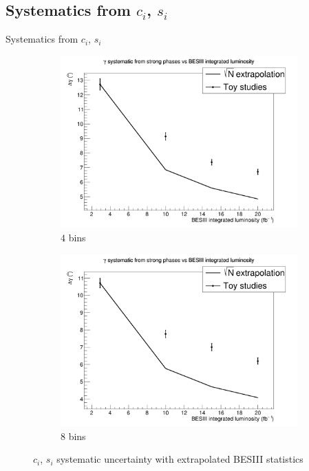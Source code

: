 \documentclass{beamer}
\begin{document}
\subsection{Systematics from \texorpdfstring{$c_i$, $s_i$}{ci, si}}
\begin{frame}{Systematics from $c_i$, $s_i$}
  \begin{figure}
    \centering
    \vspace{-0.2cm}
    \begin{subfigure}{0.5\textwidth}
      \includegraphics[width = 1.0\textwidth]{cisi_Systematic_4Bins_Run2.png}
      \caption{$4$ bins}
    \end{subfigure}%
    \begin{subfigure}{0.5\textwidth}
      \includegraphics[width = 1.0\textwidth]{cisi_Systematic_8Bins_Run2.png}
      \caption{$8$ bins}
    \end{subfigure}
    \caption{$c_i$, $s_i$ systematic uncertainty with extrapolated BESIII statistics}
  \end{figure}
\end{frame}
\end{document}
